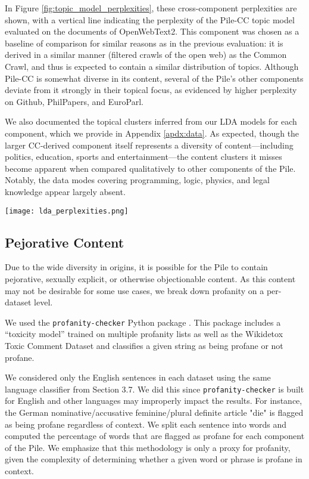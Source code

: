 \documentclass[11pt,a4paper]{article}
\begin{document}
In Figure \ref{fig:topic_model_perplexities}, these cross-component perplexities are shown, with a vertical line indicating the perplexity of the Pile-CC topic model evaluated on the documents of OpenWebText2. This component was chosen as a baseline of comparison for similar reasons as in the previous evaluation: it is derived in a similar manner (filtered crawls of the open web) as the Common Crawl, and thus is expected to contain a similar distribution of topics. Although Pile-CC is somewhat diverse in its content, several of the Pile's other components deviate from it strongly in their topical focus, as evidenced by higher perplexity on Github, PhilPapers, and EuroParl.

We also documented the topical clusters inferred from our LDA models for each component, which we provide in Appendix \ref{apdx:data}. As expected, though the larger CC-derived component itself represents a diversity of content---including politics, education, sports and entertainment---the content clusters it misses become apparent when compared qualitatively to other components of the Pile. Notably, the data modes covering programming, logic, physics, and legal knowledge appear largely absent.

\begin{figure*}[ht]
  \texttt{[image: lda\_perplexities.png]}
  \caption{Log perplexity of 16-topic LDA trained on Pile-CC, on other Pile components. Dotted line indicates log perplexity of the topic model on OpenWebText2. Higher indicates a larger topical divergence from Pile-CC.}
  \label{fig:topic_model_perplexities}
\end{figure*}


\subsection{Pejorative Content}
Due to the wide diversity in origins, it is possible for the Pile to contain pejorative, sexually explicit, or otherwise objectionable content. As this content may not be desirable for some use cases, we break down profanity on a per-dataset level.

We used the \texttt{profanity-checker} Python package \cite{profanity-checker}. This package includes a ``toxicity model'' trained on multiple profanity lists as well as the Wikidetox Toxic Comment Dataset \citep{wiki-detox} and classifies a given string as being profane or not profane.

We considered only the English sentences in each dataset using the same language classifier from Section 3.7. We did this since \texttt{profanity-checker} is built for English and other languages may improperly impact the results. For instance, the German nominative/accusative feminine/plural definite article "die" is flagged as being profane regardless of context. We split each sentence into words and computed the percentage of words that are flagged as profane for each component of the Pile. We emphasize that this methodology is only a proxy for profanity, given the complexity of determining whether a given word or phrase is profane in context.
\end{document}
